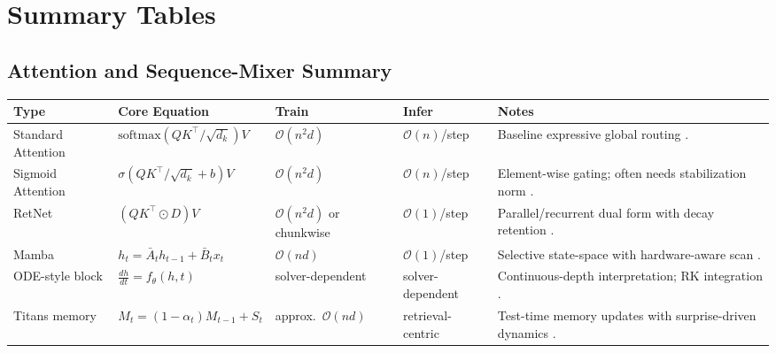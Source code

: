 \documentclass[11pt,a4paper]{article}
\begin{document}
\section{Summary Tables}
\label{sec:summary-tables}

\subsection{Attention and Sequence-Mixer Summary}
\small
\begin{longtable}{p{2.4cm}p{3.2cm}p{2.0cm}p{2.0cm}p{4.8cm}}
\toprule
\textbf{Type} & \textbf{Core Equation} & \textbf{Train} & \textbf{Infer} & \textbf{Notes} \\
\midrule
\endhead
Standard Attention & $\text{softmax}(QK^\top/\sqrt{d_k})V$ & $\mathcal{O}(n^2d)$ & $\mathcal{O}(n)$/step & Baseline expressive global routing \citep{vaswani_attention_2017}. \\
Sigmoid Attention & $\sigma(QK^\top/\sqrt{d_k}+b)V$ & $\mathcal{O}(n^2d)$ & $\mathcal{O}(n)$/step & Element-wise gating; often needs stabilization norm \citep{ramapuram_theory_2024}. \\
RetNet & $(QK^\top\odot D)V$ & $\mathcal{O}(n^2d)$ or chunkwise & $\mathcal{O}(1)$/step & Parallel/recurrent dual form with decay retention \citep{sun_retentive_2023}. \\
Mamba & $h_t=\bar{A}_t h_{t-1}+\bar{B}_t x_t$ & $\mathcal{O}(nd)$ & $\mathcal{O}(1)$/step & Selective state-space with hardware-aware scan \citep{gu_mamba_2023}. \\
ODE-style block & $\frac{dh}{dt}=f_\theta(h,t)$ & solver-dependent & solver-dependent & Continuous-depth interpretation; RK integration \citep{zhang_continuous_2021}. \\
Titans memory & $M_t=(1-\alpha_t)M_{t-1}+S_t$ & approx.\ $\mathcal{O}(nd)$ & retrieval-centric & Test-time memory updates with surprise-driven dynamics \citep{behrouz_titans_2025}. \\
\bottomrule
\end{longtable}
\normalsize
\end{document}
